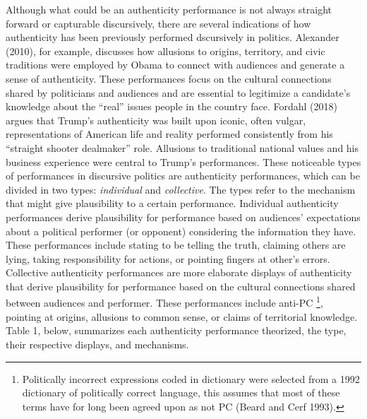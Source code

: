 \documentclass[smallextended]{svjour3}       %
\begin{document}
Although what could be an authenticity performance is not always
straight forward or capturable discursively, there are several
indications of how authenticity has been previously performed
dscursively in politics. Alexander (2010), for example, discusses how
allusions to origins, territory, and civic traditions were employed by
Obama to connect with audiences and generate a sense of authenticity.
These performances focus on the cultural connections shared by
politicians and audiences and are essential to legitimize a candidate's
knowledge about the ``real'' issues people in the country face. Fordahl
(2018) argues that Trump's authenticity was built upon iconic, often
vulgar, representations of American life and reality performed
consistently from his ``straight shooter dealmaker'' role. Allusions to
traditional national values and his business experience were central to
Trump's performances. These noticeable types of performances in
discursive politics are authenticity performances, which can be divided
in two types: \emph{individual} and \emph{collective}. The types refer
to the mechanism that might give plausibility to a certain performance.
Individual authenticity performances derive plausibility for performance
based on audiences' expectations about a political performer (or
opponent) considering the information they have. These performances
include stating to be telling the truth, claiming others are lying,
taking responsibility for actions, or pointing fingers at other's
errors. Collective authenticity performances are more elaborate displays
of authenticity that derive plausibility for performance based on the
cultural connections shared between audiences and performer. These
performances include anti-PC \footnote{ Politically incorrect
  expressions coded in dictionary were selected from a 1992 dictionary
  of politically correct language, this assumes that most of these terms
  have for long been agreed upon as not PC (Beard and Cerf 1993).},
pointing at origins, allusions to common sense, or claims of territorial
knowledge. Table 1, below, summarizes each authenticity performance
theorized, the type, their respective displays, and mechanisms.
\end{document}
